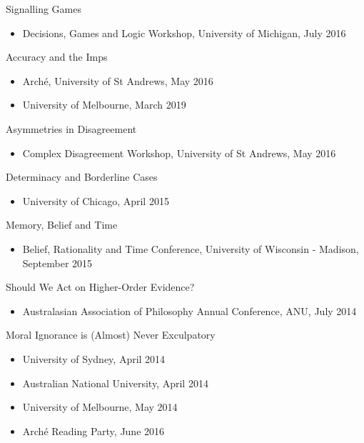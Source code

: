 \documentclass[
  10pt,
  letterpaper,
  DIV=11,
  numbers=noendperiod,
  twoside]{scrartcl}
\providecommand{\tightlist}{%
  \setlength{\itemsep}{0pt}\setlength{\parskip}{0pt}}\usepackage{longtable,booktabs,array}
\begin{document}
Signalling Games

\begin{itemize}
\tightlist
\item
  Decisions, Games and Logic Workshop, University of Michigan, July 2016
\end{itemize}

Accuracy and the Imps

\begin{itemize}
\tightlist
\item
  Arché, University of St Andrews, May 2016
\item
  University of Melbourne, March 2019
\end{itemize}

Asymmetries in Disagreement

\begin{itemize}
\tightlist
\item
  Complex Disagreement Workshop, University of St Andrews, May 2016
\end{itemize}

Determinacy and Borderline Cases

\begin{itemize}
\tightlist
\item
  University of Chicago, April 2015
\end{itemize}

Memory, Belief and Time

\begin{itemize}
\tightlist
\item
  Belief, Rationality and Time Conference, University of Wisconsin -
  Madison, September 2015
\end{itemize}

Should We Act on Higher-Order Evidence?

\begin{itemize}
\tightlist
\item
  Australasian Association of Philosophy Annual Conference, ANU, July
  2014
\end{itemize}

Moral Ignorance is (Almost) Never Exculpatory

\begin{itemize}
\tightlist
\item
  University of Sydney, April 2014
\item
  Australian National University, April 2014
\item
  University of Melbourne, May 2014
\item
  Arché Reading Party, June 2016
\end{itemize}
\end{document}
